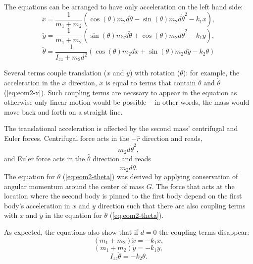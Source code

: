 \documentclass{article}
\begin{document}
The equations can be arranged to have only acceleration on the left hand side:
\begin{equation}
    \ddot{x} = \frac{1}{m_1 + m_2} \left( \cos(\theta) m_2 d \ddot{\theta} - \sin(\theta) m_2 d \dot{\theta}^2 - k_1 x \right),\label{eq:eom2-x}
\end{equation}
\begin{equation}
   \ddot{y} = \frac{1}{m_1 + m_2} \left(\sin(\theta) m_2 d \ddot{\theta} + \cos(\theta) m_2 d \dot{\theta}^2 - k_1 y \right),\label{eq:eom2-y}
\end{equation}
\begin{equation}
    \ddot{\theta} = \frac{1}{I_{zz} + m_2 d^2} \left(\cos(\theta) m_2 d \ddot{x} + \sin(\theta)m_2 d \ddot{y} - k_2 \theta \right) \label{eq:eom2-theta}
\end{equation}

Several terms couple translation ($x$ and $y$) with rotation ($\theta$): for example, the acceleration in the $x$ direction, $\ddot{x}$ is equal to terms that contain $\ddot{\theta}$ and $\dot{\theta}$ (\autoref{eq:eom2-x}). Such coupling terms are necssary to appear in the equation as otherwise only linear motion would be possible -- in other words, the mass would move back and forth on a straight line.
\par 
The translational acceleration is affected by the second mass' centrifugal and Euler forces. Centrifugal force acts in the $-\hat{r}$ direction and reads, 
\begin{equation}
    m_2 d \dot{\theta}^2,
\end{equation}
and Euler force acts in the $\hat{\theta}$ direction and reads
\begin{equation}
    m_2 d \ddot{\theta}.
\end{equation}
The equation for $\ddot{\theta}$ (\autoref{eq:eom2-theta}) was derived by applying conservation of angular momentum around the center of mass $G$. The force that acts at the location where the second body is pinned to the first body depend on the first body's acceleration in $x$ and $y$ direction such that there are also coupling terms with $\ddot{x}$ and $\ddot{y}$ in the equation for $\ddot{\theta}$  (\autoref{eq:eom2-theta}).
\par 
As expected, the equations also show that if $d=0$ the coupling terms disappear:
\begin{equation}
    (m_1 + m_2) \ddot{x} = - k_1 x,
\end{equation}
\begin{equation}
   (m_1 + m_2) \ddot{y} = - k_1 y,
\end{equation}
\begin{equation}
    I_{zz}\ddot{\theta} = - k_2 \theta.
\end{equation}
\end{document}
